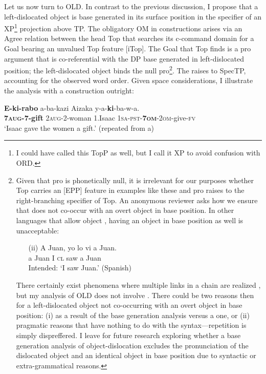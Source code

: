 \documentclass[output=paper
,newtxmath
,modfonts
,nonflat]{langsci/langscibook}
\begin{document}
\textup{Let us now turn to OLD. In contrast to the previous discussion, I propose that a left-dislocated object is base generated in its surface position in the specifier of an XP}\footnote{I could have called this TopP as well, but I call it XP to avoid confusion with ORD.} \textup{projection above TP. The obligatory OM in  constructions arises via an Agree relation between the head Top that searches its c-command domain for a Goal bearing an unvalued Top feature [iTop]. The Goal that Top finds is a} pro \textup{argument that is co-referential with the DP base generated in left-dislocated position; the left-dislocated object binds the null} pro\footnote{Given that pro is phonetically null, it is irrelevant for our purposes whether Top carries an [EPP] feature in examples like these and pro raises to the right-branching specifier of Top. An anonymous reviewer asks how we ensure that  does not co-occur with an overt object in base position. In other languages that allow object , having an object in base position as well is unacceptable:
\begin{enumerate}
	\item[(ii)] \gll  *A Juan, yo lo  vi     a Juan. \\
	 a  Juan  I    \textsc{cl} saw a Juan \\
	 \glt  Intended: ‘I saw Juan.’ (Spanish)
\end{enumerate}   There certainly exist phenomena where multiple links in a chain are realized \citep{Nunes2004}, but my analysis of OLD does not involve . There could be two reasons then for a left-dislocated object not co-occurring with an overt object in base position: (i) as a result of the base generation analysis versus a  one, or (ii) pragmatic reasons that have nothing to do with the syntax—repetition is simply dispreffered. I leave for future research exploring whether a base generation analysis of object-dislocation excludes the pronunciation of the dislocated object and an identical object in base position due to syntactic or extra-grammatical reasons.}\textup{. The  raises to SpecTP, accounting for the observed word order. Given space considerations, I illustrate the analysis with a  construction outright:}


\ea\label{ex:ranero:32}
\gll \textbf{E-ki-rabo} a-ba-kazi           Aizaka y-a-\textbf{ki}{}-ba{}-w-a.\\
\textbf{7\textsc{aug}}\textbf{{}-7-gift} 2\textsc{aug}{}-2-woman 1.Isaac \textsc{1sa-pst-}\textbf{\textsc{7om}}\textsc{{}-}\textsc{2om}{}-give-\textsc{fv}\\
\glt ‘Isaac gave the women a gift.’ (repeated from a)
\end{document}
